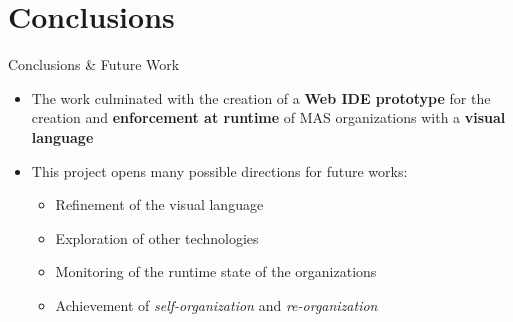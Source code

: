 \section{Conclusions}
\begin{frame}{Conclusions \& Future Work}
    \begin{itemize}
        \item The work culminated with the creation of a \textbf{Web IDE prototype} for the creation and \textbf{enforcement at runtime} of MAS organizations with a \textbf{visual language}
        \vspace{1cm}
        \item This project opens many possible directions for future works:
        \begin{itemize}
            \item Refinement of the visual language
            \item Exploration of other technologies
            \item Monitoring of the runtime state of the organizations
            \item Achievement of \emph{self-organization} and \emph{re-organization}
        \end{itemize}
    \end{itemize}
\end{frame}